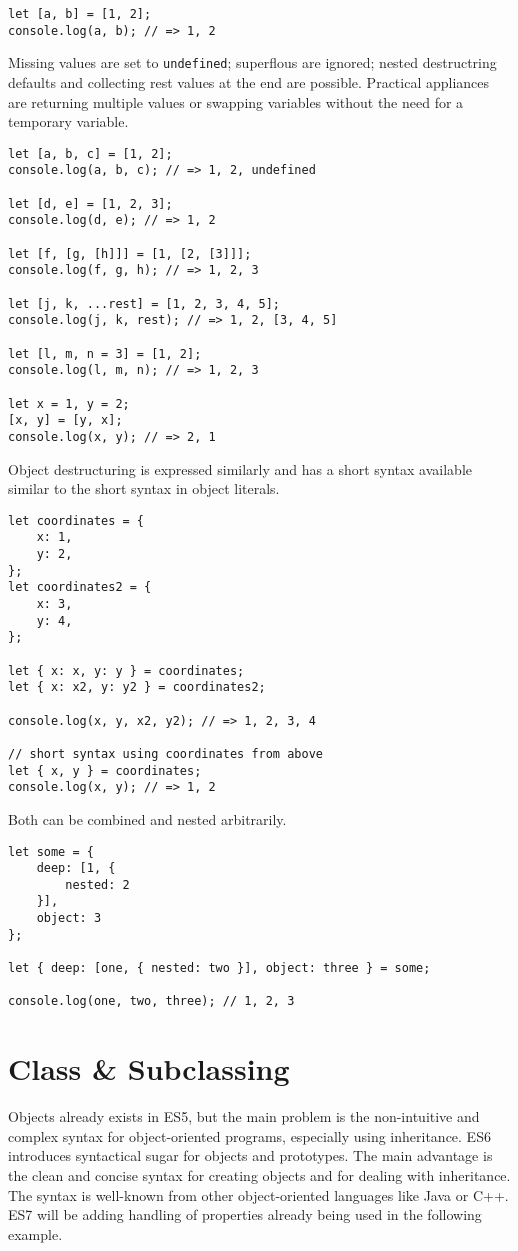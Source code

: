 \documentclass{bioinfo}
\begin{document}
\begin{lstlisting}
let [a, b] = [1, 2];
console.log(a, b); // => 1, 2
\end{lstlisting}

Missing values are set to {\tt undefined}; superflous are ignored; nested destructring
defaults and collecting rest values at the end are possible.
Practical appliances are returning multiple values or swapping variables
without the need for a temporary variable.

\begin{lstlisting}
let [a, b, c] = [1, 2];
console.log(a, b, c); // => 1, 2, undefined

let [d, e] = [1, 2, 3];
console.log(d, e); // => 1, 2

let [f, [g, [h]]] = [1, [2, [3]]];
console.log(f, g, h); // => 1, 2, 3

let [j, k, ...rest] = [1, 2, 3, 4, 5];
console.log(j, k, rest); // => 1, 2, [3, 4, 5]

let [l, m, n = 3] = [1, 2];
console.log(l, m, n); // => 1, 2, 3

let x = 1, y = 2;
[x, y] = [y, x];
console.log(x, y); // => 2, 1
\end{lstlisting}

Object destructuring is expressed similarly and has a short syntax available
similar to the short syntax in object literals.
\begin{lstlisting}
let coordinates = {
    x: 1,
    y: 2,
};
let coordinates2 = {
    x: 3,
    y: 4,
};

let { x: x, y: y } = coordinates;
let { x: x2, y: y2 } = coordinates2;

console.log(x, y, x2, y2); // => 1, 2, 3, 4

// short syntax using coordinates from above
let { x, y } = coordinates;
console.log(x, y); // => 1, 2
\end{lstlisting}

Both can be combined and nested arbitrarily.

\begin{lstlisting}
let some = {
    deep: [1, {
        nested: 2
    }],
    object: 3
};

let { deep: [one, { nested: two }], object: three } = some;

console.log(one, two, three); // 1, 2, 3
\end{lstlisting}

\section{Class \& Subclassing}
Objects already exists in ES5, but the main problem is the non-intuitive and complex
syntax for object-oriented programs, especially using inheritance. ES6 introduces
syntactical sugar for objects and prototypes. The main advantage is the clean
and concise syntax for creating objects and for dealing with inheritance.
The syntax is well-known from other object-oriented languages like Java or C++.
ES7 will be adding handling of properties already being used in the following example.
\end{document}
